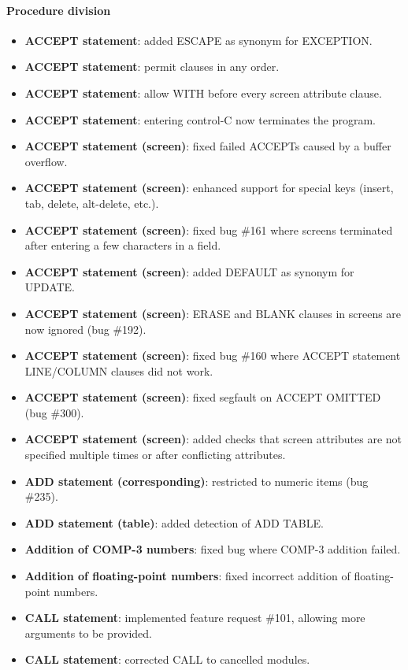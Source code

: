 \paragraph{Procedure division}
\begin{itemize}
\item \textbf{ACCEPT statement}: added ESCAPE as synonym for EXCEPTION.
\item \textbf{ACCEPT statement}: permit clauses in any order.
\item \textbf{ACCEPT statement}: allow WITH before every screen attribute clause.
\item \textbf{ACCEPT statement}: entering control-C now terminates the program.
\item \textbf{ACCEPT statement (screen)}: fixed failed ACCEPTs caused by a buffer overflow.
\item \textbf{ACCEPT statement (screen)}: enhanced support for special keys (insert, tab, delete, alt-delete, etc.).
\item \textbf{ACCEPT statement (screen)}: fixed bug \#161 where screens terminated after entering a few characters in a field.
\item \textbf{ACCEPT statement (screen)}: added DEFAULT as synonym for UPDATE.
\item \textbf{ACCEPT statement (screen)}: ERASE and BLANK clauses in screens are now ignored (bug \#192).
\item \textbf{ACCEPT statement (screen)}: fixed bug \#160 where ACCEPT statement LINE\slash{}COLUMN clauses did not work.
\item \textbf{ACCEPT statement (screen)}: fixed segfault on ACCEPT OMITTED (bug \#300).
\item \textbf{ACCEPT statement (screen)}: added checks that screen attributes are not specified multiple times or after conflicting attributes.
\item \textbf{ADD statement (corresponding)}: restricted to numeric items (bug \#235).
\item \textbf{ADD statement (table)}: added detection of ADD TABLE.
\item \textbf{Addition of COMP-3 numbers}: fixed bug where COMP-3 addition failed.
\item \textbf{Addition of floating-point numbers}: fixed incorrect addition of floating-point numbers.
\item \textbf{CALL statement}: implemented feature request \#101, allowing more arguments to be provided.
\item \textbf{CALL statement}: corrected CALL to cancelled modules.

\end{itemize}
